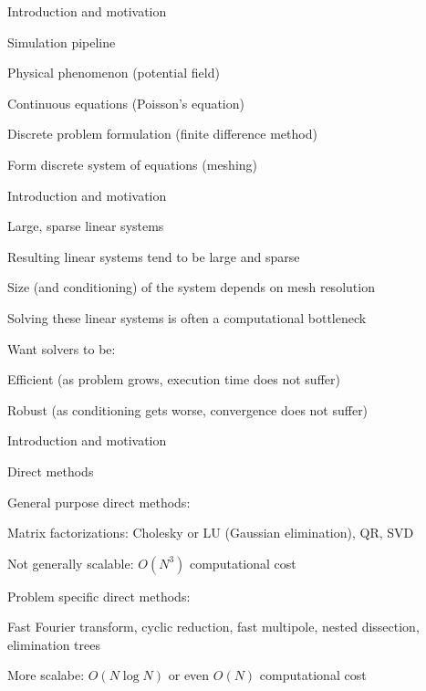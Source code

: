 \documentclass[18pt,xcolor=table]{beamer}
\begin{document}
\begin{frame}{Introduction and motivation}
\begin{block}{Simulation pipeline}
\bit
\item Physical phenomenon (potential field)
\item Continuous equations (Poisson's equation)
\item Discrete problem formulation (finite difference method)
\item Form discrete system of equations (meshing)
\eit
\end{block}
\end{frame}

\begin{frame}{Introduction and motivation}
\begin{block}{Large, sparse linear systems}
\bit
\item Resulting linear systems tend to be large and sparse
\item Size (and conditioning) of the system depends on mesh resolution
\item Solving these linear systems is often a computational bottleneck
\item Want solvers to be:
\bit
\item Efficient (as problem grows, execution time does not suffer)
\item Robust (as conditioning gets worse, convergence does not suffer)
\eit
\eit
\end{block}
\end{frame}

\begin{frame}{Introduction and motivation}
\begin{block}{Direct methods}
\bit
\item General purpose direct methods:
\bit
\item Matrix factorizations: Cholesky or LU (Gaussian elimination), QR, SVD 
\item Not generally scalable: $O(N^3)$ computational cost
\eit
\item Problem specific direct methods:
\bit
\item Fast Fourier transform, cyclic reduction, fast multipole, nested dissection, elimination trees
\item More scalabe: $O(N\log N)$ or even $O(N)$ computational cost
\eit
\eit
\end{block}
\end{frame}
\end{document}
